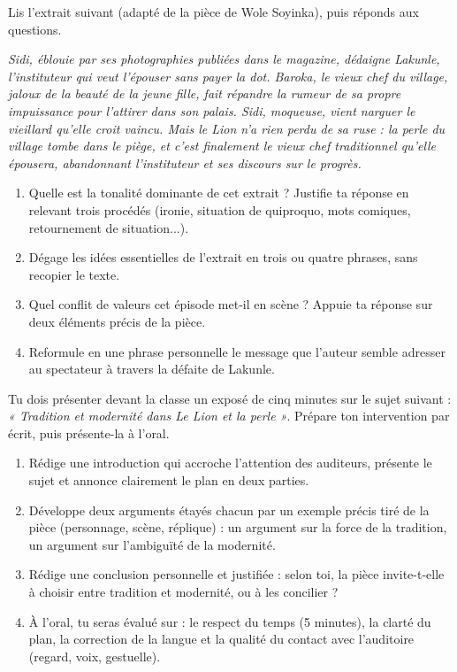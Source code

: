 \documentclass[11pt]{article}
\begin{document}
\begin{exercice}
Lis l'extrait suivant (adapté de la pièce de Wole Soyinka), puis réponds aux questions.

\emph{Sidi, éblouie par ses photographies publiées dans le magazine, dédaigne Lakunle, l'instituteur qui veut l'épouser sans payer la dot. Baroka, le vieux chef du village, jaloux de la beauté de la jeune fille, fait répandre la rumeur de sa propre impuissance pour l'attirer dans son palais. Sidi, moqueuse, vient narguer le vieillard qu'elle croit vaincu. Mais le Lion n'a rien perdu de sa ruse : la perle du village tombe dans le piège, et c'est finalement le vieux chef traditionnel qu'elle épousera, abandonnant l'instituteur et ses discours sur le progrès.}

\begin{enumerate}
\item Quelle est la tonalité dominante de cet extrait ? Justifie ta réponse en relevant trois procédés (ironie, situation de quiproquo, mots comiques, retournement de situation...).
\item Dégage les idées essentielles de l'extrait en trois ou quatre phrases, sans recopier le texte.
\item Quel conflit de valeurs cet épisode met-il en scène ? Appuie ta réponse sur deux éléments précis de la pièce.
\item Reformule en une phrase personnelle le message que l'auteur semble adresser au spectateur à travers la défaite de Lakunle.
\end{enumerate}
\end{exercice}

\begin{exercice}
Tu dois présenter devant la classe un exposé de cinq minutes sur le sujet suivant : \emph{« Tradition et modernité dans Le Lion et la perle »}. Prépare ton intervention par écrit, puis présente-la à l'oral.
\begin{enumerate}
\item Rédige une introduction qui accroche l'attention des auditeurs, présente le sujet et annonce clairement le plan en deux parties.
\item Développe deux arguments étayés chacun par un exemple précis tiré de la pièce (personnage, scène, réplique) : un argument sur la force de la tradition, un argument sur l'ambiguïté de la modernité.
\item Rédige une conclusion personnelle et justifiée : selon toi, la pièce invite-t-elle à choisir entre tradition et modernité, ou à les concilier ?
\item À l'oral, tu seras évalué sur : le respect du temps (5 minutes), la clarté du plan, la correction de la langue et la qualité du contact avec l'auditoire (regard, voix, gestuelle).
\end{enumerate}
\end{exercice}
\end{document}
